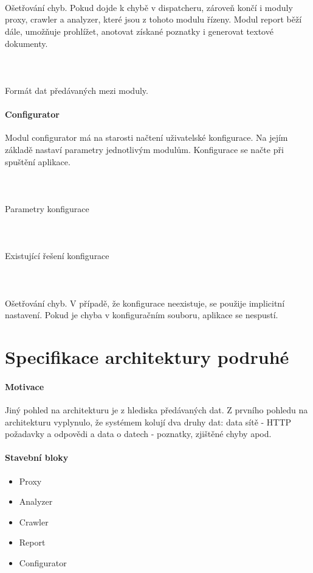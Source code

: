 \documentclass[10pt]{article}
\begin{document}
	\paragraph{~} Ošetřování chyb. Pokud dojde k chybě v dispatcheru, zároveň končí i moduly proxy, crawler a analyzer, které jsou z tohoto modulu řízeny. Modul report běží dále, umožňuje prohlížet, anotovat získané poznatky i generovat textové dokumenty.
	\paragraph{~} Formát dat předávaných mezi moduly.
	\paragraph{Configurator} Modul configurator má na starosti načtení uživatelské konfigurace. Na jejím základě nastaví parametry jednotlivým modulům.  Konfigurace se načte při spuštění aplikace.
	\paragraph{~}Parametry konfigurace
	\paragraph{~}Existující řešení konfigurace
	\paragraph{~}Ošetřování chyb. V případě, že konfigurace neexistuje, se použije implicitní nastavení. Pokud je chyba v konfiguračním souboru, aplikace se nespustí.
\section{Specifikace architektury podruh\'e}
\paragraph{Motivace} Jin\'y pohled na architekturu je z hlediska p\v{r}ed\'avan\'ych dat. Z prvn\'iho pohledu na architekturu vyplynulo, \v{z}e syst\'emem koluj\'i dva druhy dat: data s\'it\v{e} - HTTP po\v{z}adavky a odpov\v{e}di a data o datech - poznatky, zji\v{s}t\v{e}n\'e chyby apod.
\paragraph{Stavebn\'i bloky}
\begin{itemize}
	\item Proxy
	\item Analyzer
	\item Crawler
	\item Report
	\item Configurator
\end{itemize}
\end{document}
